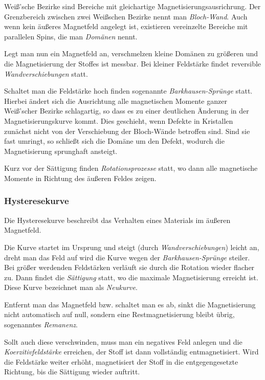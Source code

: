 \documentclass[12pt,a4paper]{scrartcl}
\numberwithin{equation}{section} %
\begin{document}
Weiß'sche Bezirke sind Bereiche mit gleichartige
Magnetisierungsausrichrung. Der Grenzbereich zwischen zwei Weißschen
Bezirke nennt man \emph{Bloch-Wand}. Auch wenn kein äußeres Magnetfeld
angelegt ist, existieren vereinzelte Bereiche mit parallelen Spins, die
man \emph{Domänen} nennt.

Legt man nun ein Magnetfeld an, verschmelzen kleine Domänen zu größeren
und die Magnetisierung der Stoffes ist messbar. Bei kleiner Feldstärke
findet reversible \emph{Wandverschiebungen} statt.

Schaltet man die Feldstärke hoch finden sogenannte
\emph{Barkhausen-Sprünge} statt. Hierbei ändert sich die Ausrichtung
alle magnetischen Momente ganzer Weiß'scher Bezirke schlagartig, so dass
es zu einer deutlichen Änderung in der Magnetisierungskurve kommt. Dies
geschieht, wenn Defekte in Kristallen zunächst nicht von der
Verschiebung der Bloch-Wände betroffen sind. Sind sie fast umringt, so
schließt sich die Domäne um den Defekt, wodurch die Magnetisierung
sprunghaft ansteigt.

Kurz vor der Sättigung finden \emph{Rotationsprozesse} statt, wo dann
alle magnetische Momente in Richtung des äußeren Feldes zeigen.

\hypertarget{hysteresekurve}{%
\subsubsection{Hysteresekurve}\label{hysteresekurve}}

Die Hysteresekurve beschreibt das Verhalten eines Materials im äußeren
Magnetfeld.

Die Kurve startet im Ursprung und steigt (durch
\emph{Wandverschiebungen}) leicht an, dreht man das Feld auf wird die
Kurve wegen der \emph{Barkhausen-Sprünge} steiler. Bei größer werdenden
Feldstärken verläuft sie durch die Rotation wieder flacher zu. Dann
findet die \emph{Sättigung} statt, wo die maximale Magnetisierung
erreicht ist. Diese Kurve bezeichnet man als \emph{Neukurve}.

Entfernt man das Magnetfeld bzw. schaltet man es ab, sinkt die
Magnetisierung nicht automatisch auf null, sondern eine
Restmagnetisierung bleibt übrig, sogenanntes \emph{Remanenz}.

Sollt auch diese verschwinden, muss man ein negatives Feld anlegen und
die \emph{Koerzitivfeldstärke} erreichen, der Stoff ist dann vollständig
entmagnetisiert. Wird die Feldstärke weiter erhöht, magnetisiert der
Stoff in die entgegengesetzte Richtung, bis die Sättigung wieder
auftritt.
\end{document}

